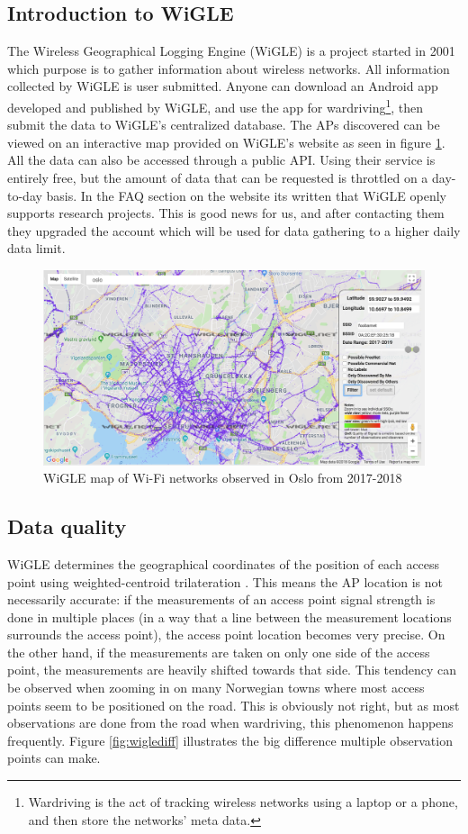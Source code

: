 \subsection{Introduction to WiGLE}
The Wireless Geographical Logging Engine (WiGLE) \cite{wigle} is a project started in 2001 which purpose is to gather information about wireless networks.
All information collected by WiGLE is user submitted. Anyone can download an Android app developed and published by WiGLE, and use the app for wardriving\footnote{Wardriving is the act of tracking wireless networks using a laptop or a phone, and then store the networks' meta data.},
then submit the data to WiGLE's centralized database. The APs discovered can be viewed on an interactive map provided on WiGLE's website as seen in figure \ref{fig:wigfig}.
All the data can also be accessed through a public API. Using their service is entirely free, but the amount of data that can be requested is throttled on a day-to-day basis.
In the FAQ section on the website its written that WiGLE openly supports research projects. This is good news for us, and after contacting them they upgraded the account which will be used
for data gathering to a higher daily data limit. 

\begin{figure}[h]
	\center
	\includegraphics[scale=0.35]{Images/wigle.png}
	\caption{WiGLE map of Wi-Fi networks observed in Oslo from 2017-2018}
	\label{fig:wigfig}
\end{figure}

\subsection{Data quality}
WiGLE determines the geographical coordinates of the position of each access point using weighted-centroid trilateration \cite{Sharma}. 
This means the AP location is not necessarily accurate:
if the measurements of an access point signal strength is done in multiple places (in a way that a line between the measurement locations surrounds the access point),
the access point location becomes very precise. On the other hand, if the measurements are taken on only one side of the access point,
the measurements are heavily shifted towards that side. This tendency can be observed
when zooming in on many Norwegian towns where most access points seem to be positioned on the road. This is obviously not right, but as most observations
are done from the road when wardriving, this phenomenon happens frequently. Figure \ref{fig:wiglediff} illustrates the big difference multiple observation points can make.

